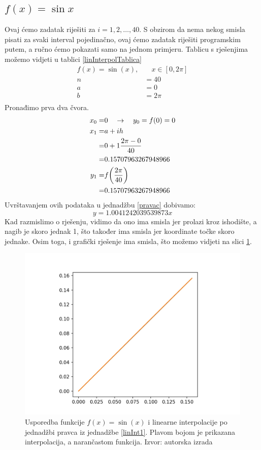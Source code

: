 \documentclass[12pt,a4paper]{report}
\begin{document}
		
		\subsection{$f(x)=\sin x$}
		Ovaj ćemo zadatak riješiti za $i=1, 2,\ldots, 40$. S obzirom da nema nekog smisla pisati za svaki interval pojedinačno, ovaj ćemo zadatak riješiti programskim putem, a ručno ćemo pokazati samo na jednom primjeru. Tablicu s rješenjima možemo vidjeti u tablici \ref{linInterpolTablica}
		\begin{align*}
			f(x)=\sin (x),& \quad x\in [0, 2\pi]\\
			n&=40\\
			a&=0\\
			b&=2\pi\\
		\end{align*}
		Pronađimo prva dva čvora.
		\begin{align*}
			x_0=&0\quad\rightarrow \quad y_0=f(0)=0\\
			x_1=&a+ih\\=&0+1\frac{2\pi-0}{40}\\
				=&0.15707963267948966\\
			y_1=&f\biggr{(}\frac{2\pi}{40}\biggr{)}\\=&0.15707963267948966
		\end{align*}
		Uvrštavanjem ovih podataka u jednadžbu \ref{pravac} dobivamo:
		\begin{equation}
			y=1.0041242039539873x
			\label{linInt1}
		\end{equation}
		Kad razmislimo o rješenju, vidimo da ono ima smisla jer prolazi kroz ishodište, a nagib je skoro jednak 1, što također ima smisla jer koordinate točke skoro jednake. Osim toga, i grafički rješenje ima smisla, što možemo vidjeti na slici \ref{linInterSlika1}.
		\begin{figure}[h]
			\includegraphics[width=\textwidth]{slike/usporedba40.png}
			\caption{Usporedba funkcije $f(x)=\sin (x)$ i linearne interpolacije po jednadžbi pravca iz jednadžbe \ref{linInt1}. Plavom bojom je prikazana interpolacija, a narančastom funkcija. Izvor: autorska izrada}
			\label{linInterSlika1}
		\end{figure}
\end{document}
